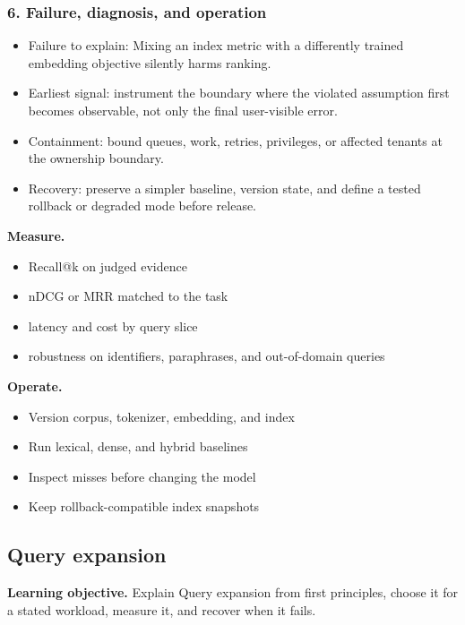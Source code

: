\subsubsection*{6. Failure, diagnosis, and operation}
\begin{itemize}
\item Failure to explain: Mixing an index metric with a differently trained embedding objective silently harms ranking.
\item Earliest signal: instrument the boundary where the violated assumption first becomes observable, not only the final user-visible error.
\item Containment: bound queues, work, retries, privileges, or affected tenants at the ownership boundary.
\item Recovery: preserve a simpler baseline, version state, and define a tested rollback or degraded mode before release.
\end{itemize}
\textbf{Measure.}\begin{itemize}
\item Recall@k on judged evidence
\item nDCG or MRR matched to the task
\item latency and cost by query slice
\item robustness on identifiers, paraphrases, and out-of-domain queries
\end{itemize}
\textbf{Operate.}\begin{itemize}
\item Version corpus, tokenizer, embedding, and index
\item Run lexical, dense, and hybrid baselines
\item Inspect misses before changing the model
\item Keep rollback-compatible index snapshots
\end{itemize}
\subsection{Query expansion}
\textbf{Learning objective.} Explain Query expansion from first principles, choose it for a stated workload, measure it, and recover when it fails.
